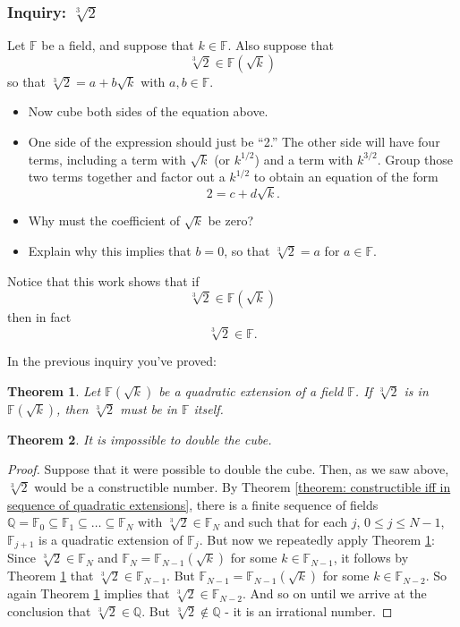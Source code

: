\documentclass[11pt]{article}
\newenvironment{task}
	{\begin{mdframed}[linecolor=lightgray, linewidth=3pt]\raggedright}
	{\end{mdframed}}
\renewcommand\subset\subseteq
\newtheorem{theorem}{Theorem}[section]
\theoremstyle{definition}
\begin{document}
\subsubsection{Inquiry: $\sqrt[3]{2}$}
\begin{task}
  Let $\mathbb{F}$ be a field, and suppose that $k\in\mathbb{F}$. Also suppose that
  \[ \sqrt[3]{2} \in \mathbb{F}(\sqrt{k})\]
  so that $\sqrt[3]{2} = a + b\sqrt{k}$ with $a,b \in \mathbb{F}$.
  \begin{itemize}
    \item Now cube both sides of the equation above.
    \item One side of the expression should just be ``2.'' The other side will have four terms, including a term with $\sqrt{k}$ (or $k^{1/2}$) and
      a term with $k^{3/2}$. Group those two terms together and factor out a $k^{1/2}$ to obtain an equation of the form
      \[ 2 = c + d\sqrt{k}.\]
    \item Why must the coefficient of $\sqrt{k}$ be zero?
    \item Explain why this implies that $b=0$, so that $\sqrt[3]{2} = a$ for $a\in \mathbb{F}$.
  \end{itemize}
  Notice that this work shows that if
  \[ \sqrt[3]{2} \in \mathbb{F}(\sqrt{k})\]
  then in fact
  \[ \sqrt[3]{2} \in \mathbb{F}.\]
\end{task}

In the previous inquiry you've proved:

\begin{theorem}
  Let $\mathbb{F}(\sqrt{k})$ be a quadratic extension of a field $\mathbb{F}$. If $\sqrt[3]{2}$ is in $\mathbb{F}(\sqrt{k})$, then $\sqrt[3]{2}$ 
  must be in $\mathbb{F}$ itself.
  \label{theorem: cube root of 2}
\end{theorem}

\begin{theorem}
  It is impossible to double the cube.
  \label{theorem: can't double cube}
\end{theorem}
\begin{proof}
  Suppose that it were possible to double the cube. Then, as we saw above, $\sqrt[3]{2}$ would be a constructible number. By 
  Theorem \ref{theorem: constructible iff in sequence of quadratic extensions}, there is a finite sequence of fields 
  $\mathbb{Q} = \mathbb{F}_0 \subset \mathbb{F}_1\subset \dots \subset \mathbb{F}_N$ with
  $\sqrt[3]{2}\in\mathbb{F}_N$ and such that for each $j$, $0\leq j \leq N-1$, $\mathbb{F}_{j+1}$ is a quadratic extension of $\mathbb{F}_j$.
  But now we repeatedly apply Theorem \ref{theorem: cube root of 2}: Since $\sqrt[3]{2}\in\mathbb{F}_N$ and $\mathbb{F}_N = \mathbb{F}_{N-1}(\sqrt{k})$
  for some $k\in\mathbb{F}_{N-1}$, it follows by Theorem \ref{theorem: cube root of 2} that $\sqrt[3]{2} \in\mathbb{F}_{N-1}$. But
  $\mathbb{F}_{N-1} = \mathbb{F}_{N-1}(\sqrt{k})$ for some $k\in\mathbb{F}_{N-2}$. So again Theorem \ref{theorem: cube root of 2} implies that
  $\sqrt[3]{2}\in\mathbb{F}_{N-2}$. And so on until we arrive at the conclusion that $\sqrt[3]{2}\in\mathbb{Q}$. But $\sqrt[3]{2}\not\in\mathbb{Q}$ - it
  is an irrational number.
\end{proof}
\
\end{document}
